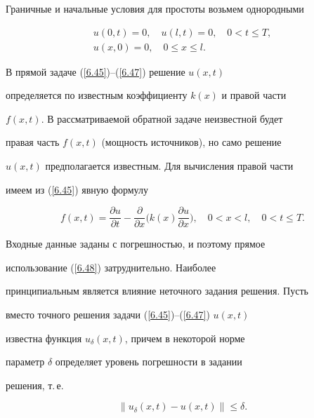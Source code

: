 Граничные и начальные условия для простоты возьмем однородными


\begin{gather}\label{6.46}


u(0,t)=0, \quad u(l,t)=0, \quad 0 < t \le T , \\


%


\label{6.47}


u(x,0)=0, \quad 0 \le x \le l .


\end{gather}





В прямой задаче (\ref{6.45})--(\ref{6.47}) решение $u(x,t)$


определяется по известным коэффициенту $k(x)$ и правой части


$f(x,t)$. В рассматриваемой обратной задаче неизвестной будет


правая часть $f(x,t)$ (мощность источников), но само решение


$u(x,t)$ предполагается известным. Для вычисления правой части


имеем из (\ref{6.45}) явную формулу


\begin{equation}\label{6.48}


f(x,t) = \frac{\partial u}{\partial t} -


\frac\partial{\partial x}\bigg(k(x)\frac{\partial u}{\partial


x}\bigg) , \quad 0 < x < l, \quad 0 < t \le T .


\end{equation}





Входные данные заданы с погрешностью, и поэтому прямое


использование (\ref{6.48}) затруднительно.  Наиболее


принципиальным является влияние неточного задания решения. Пусть


вместо точного решения задачи (\ref{6.45})--(\ref{6.47}) $u(x,t)$


известна функция $u_{\delta}(x,t)$, причем в некоторой норме


параметр $\delta$ определяет уровень погрешности в задании


решения, т.\,е.


\begin{equation}\label{6.49}


\|u_{\delta}(x,t) - u(x,t)\| \le \delta .


\end{equation}


